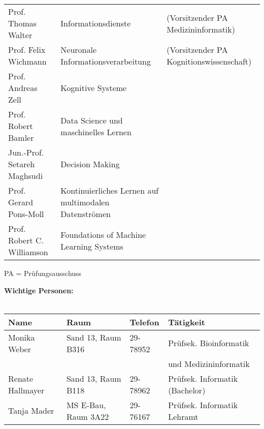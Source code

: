 \begin{tabular}{|lll|}
	Prof. Thomas Walter              & Informationsdienste                                   & (Vorsitzender PA Medizininformatik)      \\
	Prof. Felix Wichmann             & Neuronale Informationsverarbeitung                    & (Vorsitzender PA Kognitionswissenschaft) \\
	Prof. Andreas Zell               & Kognitive Systeme                                     &                                          \\
	Prof. Robert Bamler              & Data Science und maschinelles Lernen                  &                                          \\
	Jun.-Prof. Setareh Maghsudi      & Decision Making                                       &                                          \\
	Prof. Gerard Pons-Moll           & Kontinuierliches Lernen auf multimodalen Datenströmen &                                          \\
	Prof. Robert C. Williamson	 & Foundations of Machine Learning Systems		 &					    \\
	\hline
\end{tabular}
\scriptsize{PA = Prüfungsausschuss}


\textbf{Wichtige Personen:}\\\\
\begin{tabular}{|llll|}
	\hline
	Name             & Raum                & Telefon  & Tätigkeit \hfill               \\
	\hline
	\hline
	Monika Weber     & Sand 13, Raum B316  & 29-78952 & Prüfsek. Bioinformatik         \\
	                 &                     &          & und Medizininformatik          \\
	Renate Hallmayer & Sand 13, Raum B118  & 29-78962 & Prüfsek. Informatik (Bachelor) \\
	Tanja Mader      & MS E-Bau, Raum 3A22 & 29-76167 & Prüfsek. Informatik Lehramt    \\
	\hline
\end{tabular} \\

